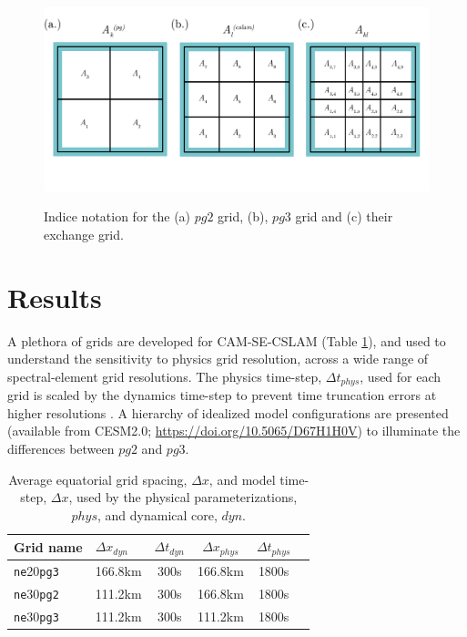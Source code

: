 \documentclass{agujournal}
\begin{document}
\begin{figure}[t]
\begin{center}
\noindent\includegraphics[width=30pc,angle=0]{figs/area-schematic.png}\\
\end{center}
\caption{Indice notation for the (a) $pg2$ grid, (b), $pg3$ grid and (c) their exchange grid.}
\label{fig:area-schematic}
\end{figure}

\section{Results}\label{sec:results}

A plethora of grids are developed for CAM-SE-CSLAM (Table \ref{table:grids}), and used to understand the sensitivity to physics grid resolution, across a wide range of spectral-element grid resolutions. The physics time-step, $\Delta t_{phys}$, used for each grid is scaled by the dynamics time-step to prevent time truncation errors at higher resolutions \citep{HR2018JAMES}. A hierarchy of idealized model configurations are presented (available from CESM2.0; \url{https://doi.org/10.5065/D67H1H0V}) to illuminate the differences between $pg2$ and $pg3$.

 \begin{table}
 \caption{Average equatorial grid spacing, $\Delta x$, and model time-step, $\Delta x$, used by the physical parameterizations, $phys$, and dynamical core, $dyn$.}
 \centering
 \begin{tabular}{llcccc}
 \hline
 Grid name & $\Delta x_{dyn}$  & $\Delta t_{dyn}$ & $\Delta x_{phys}$  & $\Delta t_{phys}$ \\
 \hline
   {\tt{ne}}20{\tt{pg3}}  & 166.8km & 300s  & 166.8km & 1800s \\
   {\tt{ne}}30{\tt{pg2}}  & 111.2km & 300s  & 166.8km & 1800s \\
   {\tt{ne}}30{\tt{pg3}}  & 111.2km & 300s  & 111.2km & 1800s \\
 \hline
 \end{tabular}
 \label{table:grids}
 \end{table}
\end{document}
